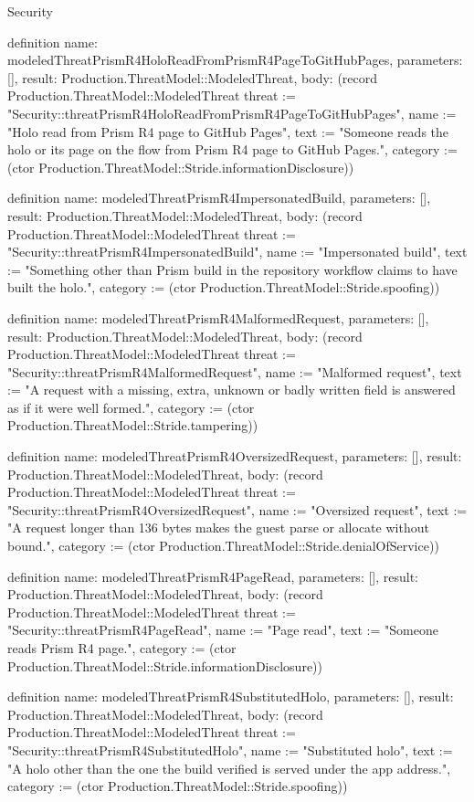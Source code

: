 \begin{lexlean}{Security}
\begin{semanticmodule}
definition{
  name: modeledThreatPrismR4HoloReadFromPrismR4PageToGitHubPages,
  parameters: [],
  result: Production.ThreatModel::ModeledThreat,
  body: (record Production.ThreatModel::ModeledThreat {threat := "Security::threatPrismR4HoloReadFromPrismR4PageToGitHubPages", name := "Holo read from Prism R4 page to GitHub Pages", text := "Someone reads the holo or its page on the flow from Prism R4 page to GitHub Pages.", category := (ctor Production.ThreatModel::Stride.informationDisclosure)})
}

definition{
  name: modeledThreatPrismR4ImpersonatedBuild,
  parameters: [],
  result: Production.ThreatModel::ModeledThreat,
  body: (record Production.ThreatModel::ModeledThreat {threat := "Security::threatPrismR4ImpersonatedBuild", name := "Impersonated build", text := "Something other than Prism build in the repository workflow claims to have built the holo.", category := (ctor Production.ThreatModel::Stride.spoofing)})
}

definition{
  name: modeledThreatPrismR4MalformedRequest,
  parameters: [],
  result: Production.ThreatModel::ModeledThreat,
  body: (record Production.ThreatModel::ModeledThreat {threat := "Security::threatPrismR4MalformedRequest", name := "Malformed request", text := "A request with a missing, extra, unknown or badly written field is answered as if it were well formed.", category := (ctor Production.ThreatModel::Stride.tampering)})
}

definition{
  name: modeledThreatPrismR4OversizedRequest,
  parameters: [],
  result: Production.ThreatModel::ModeledThreat,
  body: (record Production.ThreatModel::ModeledThreat {threat := "Security::threatPrismR4OversizedRequest", name := "Oversized request", text := "A request longer than 136 bytes makes the guest parse or allocate without bound.", category := (ctor Production.ThreatModel::Stride.denialOfService)})
}

definition{
  name: modeledThreatPrismR4PageRead,
  parameters: [],
  result: Production.ThreatModel::ModeledThreat,
  body: (record Production.ThreatModel::ModeledThreat {threat := "Security::threatPrismR4PageRead", name := "Page read", text := "Someone reads Prism R4 page.", category := (ctor Production.ThreatModel::Stride.informationDisclosure)})
}

definition{
  name: modeledThreatPrismR4SubstitutedHolo,
  parameters: [],
  result: Production.ThreatModel::ModeledThreat,
  body: (record Production.ThreatModel::ModeledThreat {threat := "Security::threatPrismR4SubstitutedHolo", name := "Substituted holo", text := "A holo other than the one the build verified is served under the app address.", category := (ctor Production.ThreatModel::Stride.spoofing)})
}


\end{semanticmodule}
\end{lexlean}
